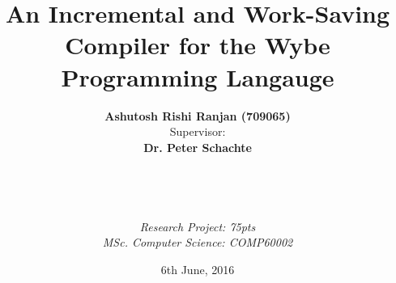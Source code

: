 \documentclass[11pt,a4paper,titlepage,twoside]{report}
\title{
  An Incremental and Work-Saving Compiler for the Wybe Programming Langauge
}
\date{6th June, 2016}
\author{
  \textbf{Ashutosh Rishi Ranjan (709065)} \\
  Supervisor: \\
  \textbf{Dr. Peter Schachte} \\ \\ \\ \\ \\ 
  \textit{Research Project: 75pts} \\
  \textit{MSc. Computer Science: COMP60002}
}
\begin{document}
\maketitle

\tableofcontents{}
\listoffigures















\end{document}
